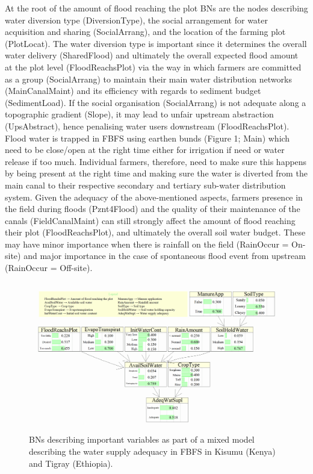 \documentclass[12pt,oneside]{article}
\begin{document}
At the root of the amount of flood reaching the plot BNs are the nodes describing water diversion type (DiversionType), the social arrangement for water acquisition and sharing (SocialArrang), and the location of the farming plot (PlotLocat). The water diversion type is important since it determines the overall water delivery (SharedFlood) and ultimately the overall expected flood amount at the plot level (FloodReachsPlot) via the way in which farmers are committed as a group (SocialArrang) to maintain their main water distribution networks (MainCanalMaint) and its efficiency with regards to sediment budget (SedimentLoad). If the social organisation (SocialArrang) is not adequate along a topographic gradient (Slope), it may lead to unfair upstream abstraction (UpsAbstract), hence penalising water users downstream (FloodReachsPlot). Flood water is trapped in FBFS using earthen bunds (Figure 1; Main) which need to be close/open at the right time either for irrigation if need or water release if too much. Individual farmers, therefore, need to make sure this happens by being present at the right time and making sure the water is diverted from the main canal to their respective secondary and tertiary sub-water distribution system. Given the adequacy of the above-mentioned aspects, farmers presence in the field during floods (Pznt4Flood) and the quality of their maintenance of the canals (FieldCanalMaint) can still strongly affect the amount of flood reaching their plot (FloodReachsPlot), and ultimately the overall soil water budget. These may have minor importance when there is rainfall on the field (RainOccur = On-site) and major importance in the case of spontaneous flood event from upstream (RainOccur = Off-site).

\begin{figure}[!htbp]

{\centering \includegraphics[width=1\linewidth,]{figures/Modelling_FBFS_Suppl_Water_Supply_Adequacy_BNs_plot} 

}

\caption{BNs describing important variables as part of a mixed model describing the water supply adequacy in FBFS in Kisumu (Kenya) and Tigray (Ethiopia).}\label{fig:fig3}
\end{figure}
\end{document}
